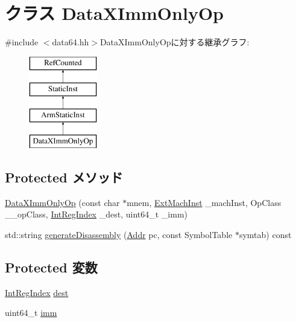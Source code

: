 \hypertarget{classArmISA_1_1DataXImmOnlyOp}{
\section{クラス DataXImmOnlyOp}
\label{classArmISA_1_1DataXImmOnlyOp}
}


{\ttfamily \#include $<$data64.hh$>$}DataXImmOnlyOpに対する継承グラフ:\begin{figure}[H]
\begin{center}
\leavevmode
\includegraphics[height=4cm]{classArmISA_1_1DataXImmOnlyOp}
\end{center}
\end{figure}
\subsection*{Protected メソッド}
\begin{DoxyCompactItemize}
\item 
\hyperlink{classArmISA_1_1DataXImmOnlyOp_a69231054b869d3350366c961f9a706e4}{DataXImmOnlyOp} (const char $\ast$mnem, \hyperlink{classStaticInst_a5605d4fc727eae9e595325c90c0ec108}{ExtMachInst} \_\-machInst, OpClass \_\-\_\-opClass, \hyperlink{namespaceArmISA_ae64680ba9fb526106829d6bf92fc791b}{IntRegIndex} \_\-dest, uint64\_\-t \_\-imm)
\item 
std::string \hyperlink{classArmISA_1_1DataXImmOnlyOp_a95d323a22a5f07e14d6b4c9385a91896}{generateDisassembly} (\hyperlink{classm5_1_1params_1_1Addr}{Addr} pc, const SymbolTable $\ast$symtab) const 
\end{DoxyCompactItemize}
\subsection*{Protected 変数}
\begin{DoxyCompactItemize}
\item 
\hyperlink{namespaceArmISA_ae64680ba9fb526106829d6bf92fc791b}{IntRegIndex} \hyperlink{classArmISA_1_1DataXImmOnlyOp_aec72e8e45bdc87abeeeb75d2a8a9a716}{dest}
\item 
uint64\_\-t \hyperlink{classArmISA_1_1DataXImmOnlyOp_a2b4406ad2843b5aa12d244d01d8fdc69}{imm}
\end{DoxyCompactItemize}


